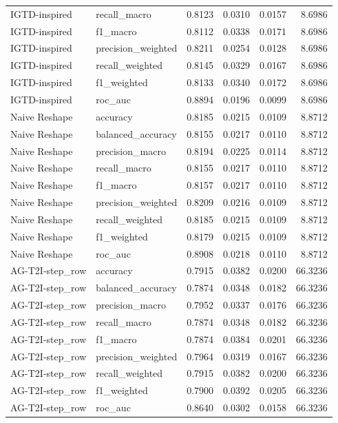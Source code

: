 \begin{tabular}{llrrrr}
IGTD-inspired & recall_macro & 0.8123 & 0.0310 & 0.0157 & 8.6986 \\
IGTD-inspired & f1_macro & 0.8112 & 0.0338 & 0.0171 & 8.6986 \\
IGTD-inspired & precision_weighted & 0.8211 & 0.0254 & 0.0128 & 8.6986 \\
IGTD-inspired & recall_weighted & 0.8145 & 0.0329 & 0.0167 & 8.6986 \\
IGTD-inspired & f1_weighted & 0.8133 & 0.0340 & 0.0172 & 8.6986 \\
IGTD-inspired & roc_auc & 0.8894 & 0.0196 & 0.0099 & 8.6986 \\
Naive Reshape & accuracy & 0.8185 & 0.0215 & 0.0109 & 8.8712 \\
Naive Reshape & balanced_accuracy & 0.8155 & 0.0217 & 0.0110 & 8.8712 \\
Naive Reshape & precision_macro & 0.8194 & 0.0225 & 0.0114 & 8.8712 \\
Naive Reshape & recall_macro & 0.8155 & 0.0217 & 0.0110 & 8.8712 \\
Naive Reshape & f1_macro & 0.8157 & 0.0217 & 0.0110 & 8.8712 \\
Naive Reshape & precision_weighted & 0.8209 & 0.0216 & 0.0109 & 8.8712 \\
Naive Reshape & recall_weighted & 0.8185 & 0.0215 & 0.0109 & 8.8712 \\
Naive Reshape & f1_weighted & 0.8179 & 0.0215 & 0.0109 & 8.8712 \\
Naive Reshape & roc_auc & 0.8908 & 0.0218 & 0.0110 & 8.8712 \\
AG-T2I-step_row & accuracy & 0.7915 & 0.0382 & 0.0200 & 66.3236 \\
AG-T2I-step_row & balanced_accuracy & 0.7874 & 0.0348 & 0.0182 & 66.3236 \\
AG-T2I-step_row & precision_macro & 0.7952 & 0.0337 & 0.0176 & 66.3236 \\
AG-T2I-step_row & recall_macro & 0.7874 & 0.0348 & 0.0182 & 66.3236 \\
AG-T2I-step_row & f1_macro & 0.7874 & 0.0384 & 0.0201 & 66.3236 \\
AG-T2I-step_row & precision_weighted & 0.7964 & 0.0319 & 0.0167 & 66.3236 \\
AG-T2I-step_row & recall_weighted & 0.7915 & 0.0382 & 0.0200 & 66.3236 \\
AG-T2I-step_row & f1_weighted & 0.7900 & 0.0392 & 0.0205 & 66.3236 \\
AG-T2I-step_row & roc_auc & 0.8640 & 0.0302 & 0.0158 & 66.3236 \\

\end{tabular}
